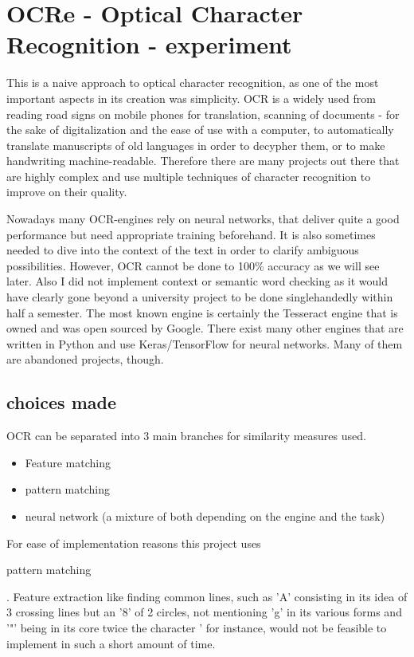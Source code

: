 




\section {OCRe - Optical Character Recognition - experiment}
This is a naive approach to optical character recognition, as one of the most important aspects in its creation was simplicity. OCR is a widely used from reading road signs on mobile phones for translation, scanning of documents - for the sake of digitalization and the ease of use with a computer, to automatically translate manuscripts of old languages in order to decypher them, or to make handwriting machine-readable. Therefore there are many projects out there that are highly complex and use multiple techniques of character recognition to improve on their quality.

Nowadays many OCR-engines rely on neural networks, that deliver quite a good performance but need appropriate training beforehand. It is also sometimes needed to dive into the context of the text in order to clarify ambiguous possibilities. However, OCR cannot be done to 100\% accuracy as we will see later. Also I did not implement context or semantic word checking as it would have clearly gone beyond a university project to be done singlehandedly within half a semester.\newline
The most known engine is certainly the Tesseract engine that is owned and was open sourced by Google.\newline
There exist many other engines that are written in Python and use Keras/TensorFlow for neural networks. Many of them are abandoned projects, though.


\subsection{choices made}
OCR can be separated into 3 main branches for similarity measures used.
\begin{itemize}
\item Feature matching
\item pattern matching
\item neural network (a mixture of both depending on the engine and the task)
\end{itemize}

For ease of implementation reasons this project uses \begin{bold} pattern matching \end{bold}.\endline
Feature extraction like finding common lines, such as 'A' consisting in its idea of 3 crossing lines but an '8' of 2 circles, not mentioning 'g' in its various forms and '"' being in its core twice the character ' for instance, would not be feasible to implement in such a short amount of time.

